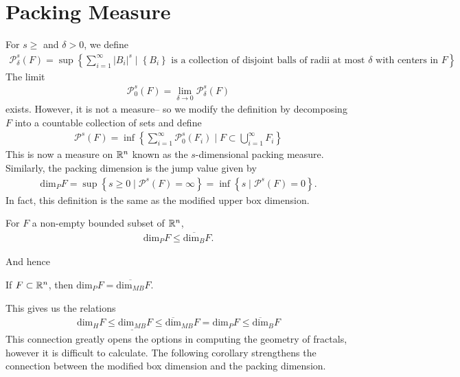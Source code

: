\documentclass{memoir}
\begin{document}
\section{Packing Measure}
\label{sec:packing_measure}

For \(s\geq \) and \(\delta>0\), we define
\begin{align*}
	\mathcal{P}^{s}_\delta(F) = \sup \left\{\sum_{i=1}^{\infty} \left| B_i \right|^{s} \mid \left\{ B_i \right\} \text{ is a collection of disjoint balls of radii at most \(\delta\) with centers in \(F\)} \right\} .
\end{align*}
The limit
\begin{align*}
	\mathcal{P}^{s}_0(F) = \lim_{\delta \to 0} \mathcal{P}^{s}_\delta(F)
\end{align*}
exists. However, it is not a measure-- so we modify the definition by decomposing \(F\) into a countable collection of sets and define
\begin{align*}
	\mathcal{P}^{s}(F) = \inf \left\{\sum_{i=1}^{\infty} \mathcal{P}^{s}_0(F_i) \mid F\subset \bigcup_{i=1}^{\infty}F_i \right\} 
\end{align*}
This is now a measure on \(\mathbb{R}^{n}\) known as the \(s\)-dimensional packing measure. Similarly, the packing dimension is the jump value given by
\begin{align*}
	\textrm{dim}_P F = \sup \left\{s\geq 0 \mid \mathcal{P}^{s}(F) = \infty \right\} = \inf \left\{s \mid \mathcal{P}^{s}(F) = 0 \right\} .
\end{align*}
In fact, this definition is the same as the modified upper box dimension.

\begin{lemma}
	For \(F\) a non-empty bounded subset of \(\mathbb{R}^{n}\),
	\begin{align*}
		\textrm{dim}_P F \leq \overline{ \textrm{dim}_B}F.
	\end{align*}
\end{lemma}
And hence
\begin{prop}
	If \(F\subset \mathbb{R}^{n}\), then \(\textrm{dim}_PF = \overline{\textrm{dim}_{MB}}F\).
\end{prop}
This gives us the relations
\begin{align*}
	\textrm{dim}_H F \leq \underline{\textrm{dim}_{MB}}F \leq \overline{\textrm{dim}}_{MB}F = \textrm{dim}_P F \leq \overline{\textrm{dim}}_B F
\end{align*}
This connection greatly opens the options in computing the geometry of fractals, however it is difficult to calculate. The following corollary strengthens the connection between the modified box dimension and the packing dimension.
\end{document}
